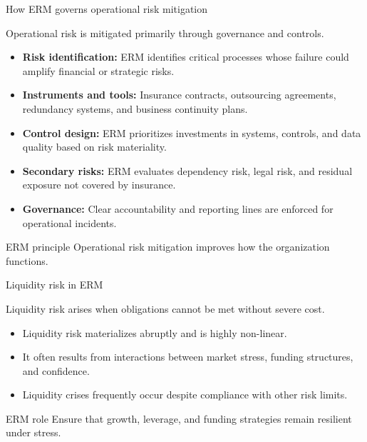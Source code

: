 \documentclass[aspectratio=169, 10pt]{beamer} %
\begin{document}
\begin{frame}{How ERM governs operational risk mitigation}

Operational risk is mitigated primarily through governance and controls.

\medskip

\begin{itemize}
  \item[$\bullet$] \textbf{Risk identification:} ERM identifies critical
  processes whose failure could amplify financial or strategic risks.

  \item[$\bullet$] \textbf{Instruments and tools:} Insurance contracts,
  outsourcing agreements, redundancy systems, and business continuity plans.

  \item[$\bullet$] \textbf{Control design:} ERM prioritizes investments in
  systems, controls, and data quality based on risk materiality.

  \item[$\bullet$] \textbf{Secondary risks:} ERM evaluates dependency risk,
  legal risk, and residual exposure not covered by insurance.

  \item[$\bullet$] \textbf{Governance:} Clear accountability and reporting
  lines are enforced for operational incidents.
\end{itemize}

\begin{block}{ERM principle}
Operational risk mitigation improves how the organization functions.
\end{block}

\end{frame}

\begin{frame}{Liquidity risk in ERM}

Liquidity risk arises when obligations cannot be met without severe cost.

\medskip

\begin{itemize}
  \item[$\bullet$] Liquidity risk materializes abruptly and is highly
  non-linear.

  \item[$\bullet$] It often results from interactions between market stress,
  funding structures, and confidence.

  \item[$\bullet$] Liquidity crises frequently occur despite compliance with
  other risk limits.
\end{itemize}

\begin{block}{ERM role}
Ensure that growth, leverage, and funding strategies remain resilient
under stress.
\end{block}

\end{frame}
\end{document}
